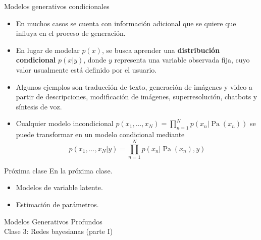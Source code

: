 \documentclass{beamer}
\begin{document}
\begin{frame}{Modelos generativos condicionales}
    \begin{itemize}
        \item En muchos casos se cuenta con información adicional que se quiere que influya en el proceso de generación.
        \item En lugar de modelar $p(x)$, se busca aprender una \textbf{distribución condicional} $p(x|y)$, donde $y$ representa una variable observada fija, cuyo valor usualmente está definido por el usuario.
        \item Algunos ejemplos son traducción de texto, generación de imágenes y video a partir de descripciones, modificación de imágenes, superresolución, chatbots y  síntesis de voz.
        \item Cualquier modelo incondicional $p(x_1,\ldots,x_N)=\prod_{n=1}^N p(x_n|\operatorname{Pa}(x_n))$ se puede transformar en un modelo condicional mediante
              \begin{equation*}
                  p(x_1,\ldots,x_N|y)=\prod_{n=1}^N
                  p(x_n|\operatorname{Pa}(x_n),y)
              \end{equation*}
    \end{itemize}
\end{frame}

\begin{frame}{Próxima clase}
    En la próxima clase.
    \begin{itemize}
        \item Modelos de variable latente.
        \item Estimación de parámetros.
    \end{itemize}
\end{frame}

\begin{frame}
    \centering
    \Large{Modelos Generativos Profundos}\\
    \large{Clase 3: Redes bayesianas (parte I)}
\end{frame}
\end{document}
